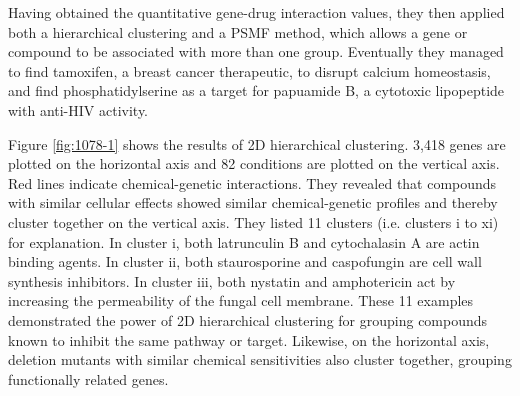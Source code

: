 \documentclass[12pt,fullpage,singlespace]{article}
\begin{document}
Having obtained the quantitative gene-drug interaction values, they then applied both a hierarchical clustering and a PSMF method, which allows a gene or compound to be associated with more than one group. Eventually they managed to find tamoxifen, a breast cancer therapeutic, to disrupt calcium homeostasis, and find phosphatidylserine as a target for papuamide B, a cytotoxic lipopeptide with anti-HIV activity.

Figure \ref{fig:1078-1} shows the results of 2D hierarchical clustering. 3,418 genes are plotted on the horizontal axis and 82 conditions are plotted on the vertical axis. Red lines indicate chemical-genetic interactions. They revealed that compounds with similar cellular effects showed similar chemical-genetic profiles and thereby cluster together on the vertical axis. They listed 11 clusters (i.e. clusters i to xi) for explanation. In cluster i, both latrunculin B and cytochalasin A are actin binding agents. In cluster ii, both staurosporine and caspofungin are cell wall synthesis inhibitors. In cluster iii, both nystatin and amphotericin act by increasing the permeability of the fungal cell membrane. These 11 examples demonstrated the power of 2D hierarchical clustering for grouping compounds known to inhibit the same pathway or target. Likewise, on the horizontal axis, deletion mutants with similar chemical sensitivities also cluster together, grouping functionally related genes.
\end{document}
